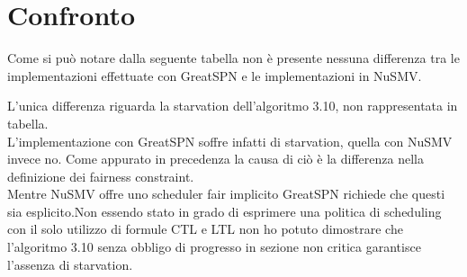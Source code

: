 \documentclass[a4paper]{article}
\begin{document}
\section{Confronto}
Come si può notare dalla seguente tabella non è presente nessuna differenza tra le implementazioni effettuate con GreatSPN e le implementazioni in NuSMV.
\begin{center}
\end{center}
L'unica differenza riguarda la starvation dell'algoritmo 3.10, non rappresentata in tabella.\\
L'implementazione con GreatSPN soffre infatti di starvation, quella con NuSMV invece no. Come appurato in precedenza la causa di ciò è la differenza nella definizione dei fairness constraint.\\
Mentre NuSMV offre uno scheduler fair implicito GreatSPN richiede che questi sia esplicito.Non essendo stato in grado di esprimere una politica di scheduling con il solo utilizzo di formule CTL e LTL non ho potuto dimostrare che l'algoritmo 3.10 senza obbligo di progresso in sezione non critica garantisce l'assenza di starvation.
\end{document}
